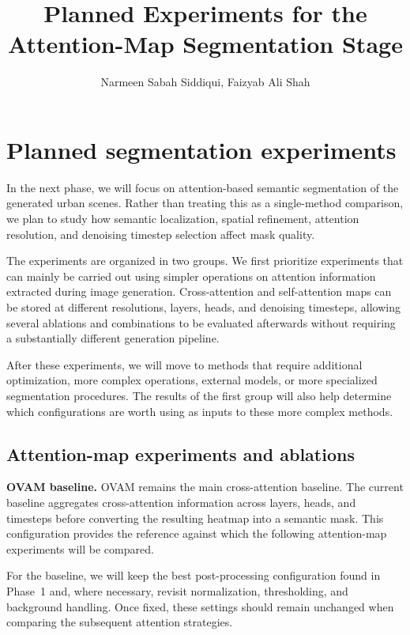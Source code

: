 \documentclass[11pt,a4paper]{article}
\title{\vspace{-1.4cm}\textbf{Planned Experiments for the Attention-Map Segmentation Stage}}
\author{Narmeen Sabah Siddiqui, Faizyab Ali Shah}
\date{}
\begin{document}
\maketitle
\vspace{-0.8em}

\section*{Planned segmentation experiments}

In the next phase, we will focus on attention-based semantic segmentation of the
generated urban scenes. Rather than treating this as a single-method comparison,
we plan to study how semantic localization, spatial refinement, attention resolution,
and denoising timestep selection affect mask quality.

The experiments are organized in two groups. We first prioritize experiments that
can mainly be carried out using simpler operations on attention information extracted during image
generation. Cross-attention and self-attention maps can be stored at different
resolutions, layers, heads, and denoising timesteps, allowing several ablations and
combinations to be evaluated afterwards without requiring a substantially different
generation pipeline.

After these experiments, we will move to methods that require additional
optimization, more complex operations, external models, or more specialized segmentation procedures. The
results of the first group will also help determine which configurations are worth
using as inputs to these more complex methods.

\subsection*{Attention-map experiments and ablations}

\textbf{OVAM baseline.}
OVAM remains the main cross-attention baseline. The current baseline aggregates
cross-attention information across layers, heads, and timesteps before converting
the resulting heatmap into a semantic mask. This configuration provides the
reference against which the following attention-map experiments will be compared.

For the baseline, we will keep the best post-processing configuration found in
Phase~1 and, where necessary, revisit normalization, thresholding, and background
handling. Once fixed, these settings should remain unchanged when comparing the
subsequent attention strategies.
\end{document}
